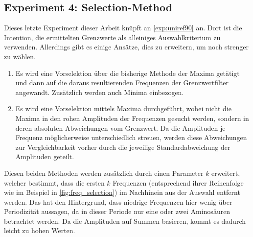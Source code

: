     \subsection{Experiment 4: Selection-Method} %
    \label{exp:selection_method}
    Dieses letzte Experiment dieser Arbeit knüpft an \autoref{exp:uniref90} an. Dort ist die Intention, die ermittelten Grenzwerte als alleiniges Auswahlkriterium zu verwenden. Allerdings gibt es einige Ansätze, dies zu erweitern, um noch strenger zu wählen.
    
    \begin{enumerate}
        \item Es wird eine Vorselektion über die bisherige Methode der Maxima getätigt und dann auf die daraus resultierenden Frequenzen der Grenzwertfilter angewandt. Zusätzlich werden auch Minima einbezogen.
        \item Es wird eine Vorselektion mittels Maxima durchgeführt, wobei nicht die Maxima in den rohen Amplituden der Frequenzen gesucht werden, sondern in deren absoluten Abweichungen vom Grenzwert. Da die Amplituden je Frequenz möglicherweise unterschiedlich streuen, werden diese Abweichungen zur Vergleichbarkeit vorher durch die jeweilige Standardabweichung der Amplituden geteilt.
    \end{enumerate}

    Diesen beiden Methoden werden zusätzlich durch einen Parameter $k$ erweitert, welcher bestimmt, dass die ersten $k$ Frequenzen (entsprechend ihrer Reihenfolge wie im Beispiel in \autoref{fig:freq_selection}) im Nachhinein aus der Auswahl entfernt werden. Das hat den Hintergrund, dass niedrige Frequenzen hier wenig über Periodizität aussagen, da in dieser Periode nur eine oder zwei Aminosäuren betrachtet werden. Da die Amplituden auf Summen basieren, kommt es dadurch leicht zu hohen Werten.
